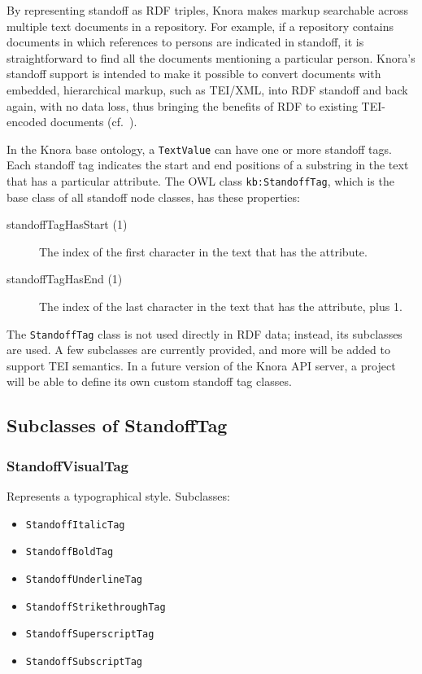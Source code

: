 \documentclass[12pt, a4paper]{article}
\begin{document}
By representing standoff as RDF triples, Knora makes markup searchable across multiple text documents in a repository. For example, if a repository contains documents in which references to persons are indicated in standoff, it is straightforward to find all the documents mentioning a particular person. Knora's standoff support is intended to make it possible to convert documents with embedded, hierarchical markup, such as TEI/XML, into RDF standoff and back again, with no data loss, thus bringing the benefits of RDF to existing TEI-encoded documents (cf.~\cite[3]{Schmidt_Standoff}).

In the Knora base ontology, a \texttt{TextValue} can have one or more standoff tags. Each standoff tag indicates the start and end positions of a substring in the text that has a particular attribute. The OWL class \texttt{kb:StandoffTag}, which is the base class of all standoff node classes, has these properties:

\begin{description}
	\item[standoffTagHasStart (1)] The index of the first character in the text that has the attribute.
	\item[standoffTagHasEnd (1)] The index of the last character in the text that has the attribute, plus 1.
\end{description}

The \texttt{StandoffTag} class is not used directly in RDF data; instead, its subclasses are used. A few subclasses are currently provided, and more will be added to support TEI semantics. In a future version of the Knora API server, a project will be able to define its own custom standoff tag classes.

\subsection{Subclasses of StandoffTag}

\subsubsection{StandoffVisualTag}

Represents a typographical style. Subclasses:

\begin{itemize}
	\item \texttt{StandoffItalicTag}
	\item \texttt{StandoffBoldTag}
	\item \texttt{StandoffUnderlineTag}
	\item \texttt{StandoffStrikethroughTag}
	\item \texttt{StandoffSuperscriptTag}
	\item \texttt{StandoffSubscriptTag}
\end{itemize}
\end{document}
